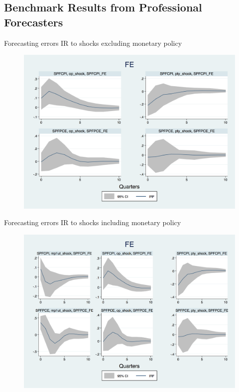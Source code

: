 \documentclass{beamer}
\begin{document}
\subsection{Benchmark Results from Professional Forecasters }

\begin{frame}{Forecasting errors IR to  shocks excluding monetary policy}

\begin{figure}
	\includegraphics[scale=0.3]{figures/SPFFE_ashocks_nmp.png} 
\end{figure}

\end{frame}


\begin{frame}{Forecasting errors IR to  shocks including monetary policy}

\begin{figure}
	\includegraphics[scale=0.3]{figures/SPFFE_ashocks.png} 
\end{figure}

\end{frame}
\end{document}
